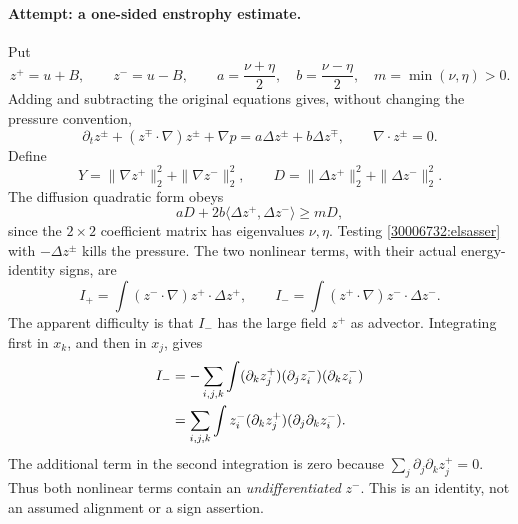 \documentclass[11pt,a4paper]{article}
\numberwithin{equation}{section}
\begin{document}
\paragraph{Attempt: a one-sided enstrophy estimate.}
Put
\[
 z^+=u+B,\qquad z^-=u-B,\qquad
 a=\frac{\nu+\eta}{2},\quad b=\frac{\nu-\eta}{2},\quad
 m=\min(\nu,\eta)>0.
\]
Adding and subtracting the original equations gives, without changing the
pressure convention,
\begin{equation}\label{30006732:elsasser}
 \partial_tz^\pm+(z^\mp\cdot\nabla)z^\pm+\nabla p
 =a\Delta z^\pm+b\Delta z^\mp,
 \qquad \nabla\cdot z^\pm=0.
\end{equation}
Define
\[
 Y=\|\nabla z^+\|_2^2+\|\nabla z^-\|_2^2,\qquad
 D=\|\Delta z^+\|_2^2+\|\Delta z^-\|_2^2.
\]
The diffusion quadratic form obeys
\begin{equation}\label{30006732:diffusion}
 aD+2b\langle\Delta z^+,\Delta z^-\rangle\geq mD,
\end{equation}
since the $2\times2$ coefficient matrix has eigenvalues $\nu,\eta$.
Testing \eqref{30006732:elsasser} with $-\Delta z^\pm$ kills the pressure.
The two nonlinear terms, with their actual energy-identity signs, are
\[
 I_+=\int (z^-\cdot\nabla)z^+\cdot\Delta z^+,
 \qquad I_-=\int (z^+\cdot\nabla)z^-\cdot\Delta z^-.
\]
The apparent difficulty is that $I_-$ has the large field $z^+$ as
advector. Integrating first in $x_k$, and then in $x_j$, gives
\begin{align}
 I_-&=-\sum_{i,j,k}\int
       (\partial_k z^+_j)(\partial_j z^-_i)(\partial_k z^-_i)
       \notag\\
 &=\sum_{i,j,k}\int z^-_i(\partial_k z^+_j)
                         (\partial_j\partial_k z^-_i).
 \label{30006732:cancellation}
\end{align}
The additional term in the second integration is zero because
$\sum_j\partial_j\partial_k z^+_j=0$. Thus both nonlinear terms contain
an \emph{undifferentiated} $z^-$. This is an identity, not an assumed
alignment or a sign assertion.
\end{document}
